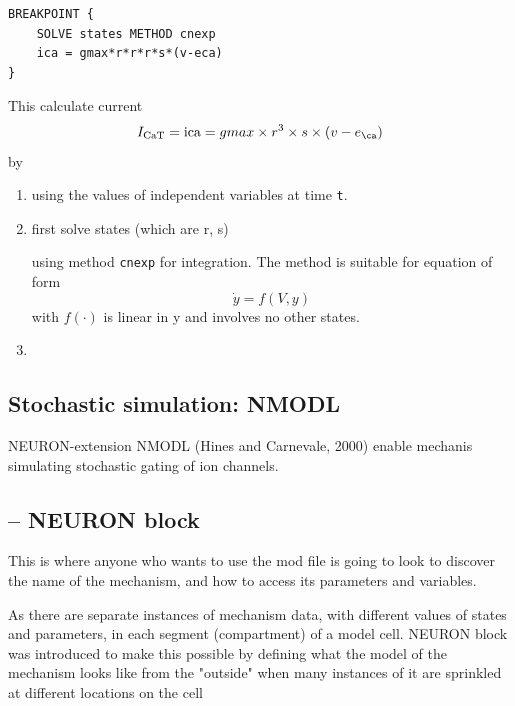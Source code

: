\begin{verbatim}
BREAKPOINT {
    SOLVE states METHOD cnexp
    ica = gmax*r*r*r*s*(v-eca)
}
\end{verbatim}

This calculate current
\begin{equation}
I_\text{CaT} = \text{ica} = gmax \times r^3 \times s \times (v-e_\ca)
\end{equation}
by
\begin{enumerate}
  \item using the values of independent variables at time \verb!t!.
    
  \item first solve states (which are r, s)
  
  using method \verb!cnexp! for integration. The method is suitable for equation
  of form
  \begin{equation}
  \dot{y} = f(V,y)
  \end{equation}
  with $f(\cdot)$ is linear in y and involves no other states.
  
  
  \item 
\end{enumerate}


\subsection{Stochastic simulation: NMODL}
\label{sec:NEURON-stochastic-simulatiion}

NEURON-extension NMODL (Hines and Carnevale, 2000) enable mechanis simulating
stochastic gating of ion channels.



\subsection{-- NEURON block}
\label{sec:NMODL-block-NEURON}

This is where anyone who wants to use the mod file is going to look to discover
the name of the mechanism, and how to access its parameters and variables.

As there are separate instances of mechanism data, with different values of
states and parameters, in each segment (compartment) of a model cell.
NEURON block was introduced to make this possible by defining what the
model of the mechanism looks like from the "outside" when many instances of
it are sprinkled at different locations on the cell

